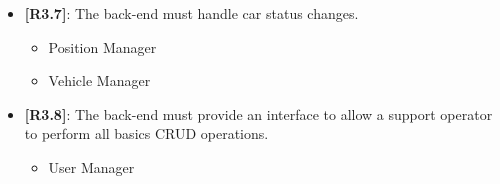 \begin{itemize}
	\item {\textbf{[R3.7]}}: The back-end must handle car status changes.
	\begin{itemize}
	\item Position Manager
	\item Vehicle Manager
	\end{itemize}
	
	\item {\textbf{[R3.8]}}: The back-end must provide an interface to allow a support operator to perform all basics CRUD operations.
	\begin{itemize}
	\item User Manager\\
	\end{itemize}

\end{itemize}







